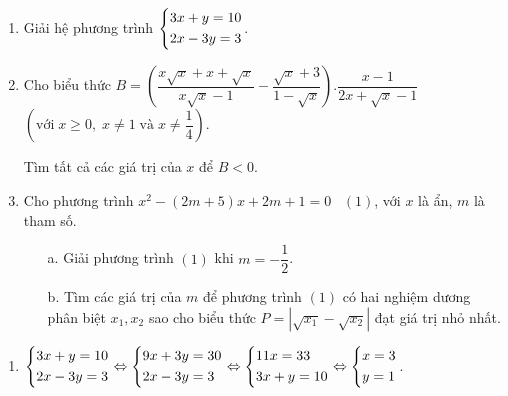 \begin{ex}%
    \hfill
    \begin{enumerate}
        \item Giải hệ phương trình $\left\{\begin{aligned}&3x+y=10\\&2x-3y=3\end{aligned}\right.$.
        \item Cho biểu thức $B=\left(\dfrac{x\sqrt{x}+x+\sqrt{x}}{x\sqrt{x}-1}-\dfrac{\sqrt{x}+3}{1-\sqrt{x}}\right).\dfrac{x-1}{2x+\sqrt{x}-1}$  $\left(\text{với}\; x\ge 0,\; x\ne 1\; \text{và}\; x\ne \dfrac{1}{4}\right)$.
        
        
        Tìm tất cả các giá trị của $x$ để $B<0$.
        \item Cho phương trình $x^2-\left(2m+5\right)x+2m+1=0\;\;\; (1)$, với $x$ là ẩn, $m$ là tham số.
        \begin{enumerate}
         \item[a.] Giải phương trình $(1)$ khi $m=-\dfrac{1}{2}$.
         \item[b.] Tìm các giá trị của $m$ để phương trình $(1)$ có hai nghiệm dương phân biệt $x_1,x_2$ sao cho biểu thức $P=\left|\sqrt{x_1}-\sqrt{x_2}\right|$ đạt giá trị nhỏ nhất.
        \end{enumerate}
    \end{enumerate}
\loigiai
    {
    \begin{enumerate}
        \item $\left\{\begin{aligned}&3x+y=10\\&2x-3y=3\end{aligned}\right.\Leftrightarrow \left\{\begin{aligned}&9x+3y=30\\&2x-3y=3\end{aligned}\right.\Leftrightarrow \left\{\begin{aligned}&11x=33\\&3x+y=10\end{aligned}\right.\Leftrightarrow \left\{\begin{aligned}&x=3\\&y=1\end{aligned}\right.$.
        

\end{enumerate}}
\end{ex}
